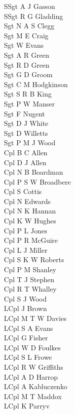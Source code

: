 \begin{multicols}{4}
  \scriptsize
  \noindent
  SSgt A J Gasson \\
  SSgt R G Gladding \\
  Sgt N A S Clegg \\
  Sgt M E Craig \\
  Sgt W Evans \\
  Sgt A R Green \\
  Sgt R D Green \\
  Sgt G D Groom \\
  Sgt C M Hodgkinson \\
  Sgt S R B King \\
  Sgt P W Manser \\
  Sgt F Nugent \\
  Sgt D J White \\
  Sgt D Willetts \\
  Sgt P M J Wood \\
  Cpl B C Allen \\
  Cpl D J Allen \\
  Cpl N B Boardman \\
  Cpl P S W Broadbere \\
  Cpl S Cottis \\
  Cpl N Edwards \\
  Cpl N K Hannan \\
  Cpl K W Hughes \\
  Cpl P L Jones \\
  Cpl P R McGuire \\
  Cpl L J Miller \\
  Cpl S K W Roberts \\
  Cpl P M Shanley \\
  Cpl T J Stephen \\
  Cpl R T Whalley \\
  Cpl S J Wood \\
  LCpl J Brown \\
  LCpl M T W Davies \\
  LCpl S A Evans \\
  LCpl G Fisher \\
  LCpl W D Foulkes \\
  LCpl S L Frowe \\
  LCpl R W Griffiths \\
  LCpl A D Harrop \\
  LCpl A Kabluczenko \\
  LCpl M T Maddox \\
  LCpl K Parryv \\

\end{multicols}
